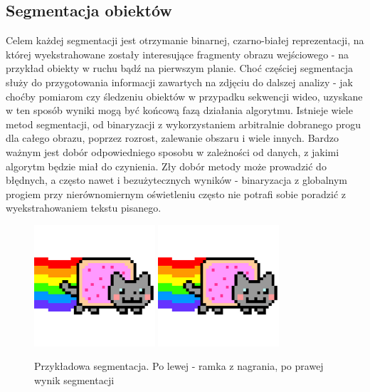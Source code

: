 \subsection{Segmentacja obiektów}
Celem każdej segmentacji jest otrzymanie binarnej, czarno-białej reprezentacji, na której wyekstrahowane zostały interesujące fragmenty obrazu wejściowego - na przykład obiekty w ruchu bądź na pierwszym planie. Choć częściej segmentacja służy do przygotowania informacji zawartych na zdjęciu do dalszej analizy - jak choćby pomiarom czy śledzeniu obiektów w przypadku sekwencji wideo, uzyskane w ten sposób wyniki mogą być końcową fazą działania algorytmu. Istnieje wiele metod segmentacji, od binaryzacji z wykorzystaniem arbitralnie dobranego progu dla całego obrazu, poprzez rozrost, zalewanie obszaru i wiele innych. Bardzo ważnym jest dobór odpowiedniego sposobu w zależności od danych, z jakimi algorytm będzie miał do czynienia. Zły dobór metody może prowadzić do błędnych, a często nawet i bezużytecznych wyników - binaryzacja z globalnym progiem przy nierównomiernym oświetleniu często nie potrafi sobie poradzić z wyekstrahowaniem tekstu pisanego.
\begin{figure}[!htb]
\centering

\includegraphics[width=0.4\textwidth]{img/sample}
\includegraphics[width=0.4\textwidth]{img/sample}
\caption{Przykładowa segmentacja. Po lewej - ramka z nagrania, po prawej wynik segmentacji}
\end{figure}

